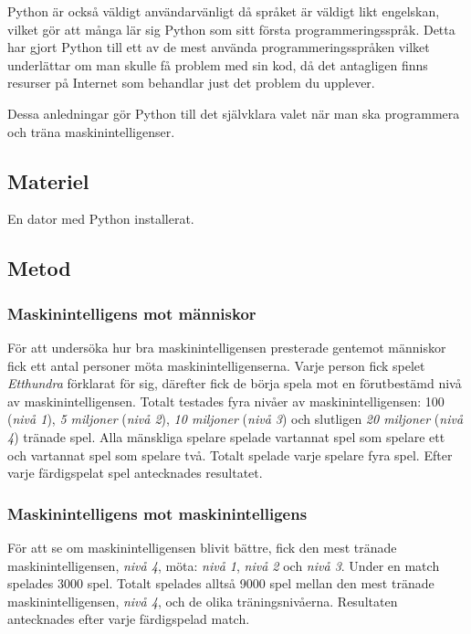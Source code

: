 \documentclass[12pt,a4paper]{article}
\begin{document}
      Python är också väldigt användarvänligt då språket är väldigt likt engelskan, vilket gör att många lär sig Python som sitt första programmeringsspråk. Detta har gjort Python till ett av de mest använda programmeringsspråken vilket underlättar om man skulle få problem med sin kod, då det antagligen finns resurser på Internet som behandlar just det problem du upplever. \cite{ref:stackoverflow}
      
      Dessa anledningar gör Python till det självklara valet när man ska programmera och träna maskinintelligenser.
    

    \subsection{Materiel}\label{subsec:materiel}
      En dator med Python installerat.
    

    \subsection{Metod}\label{subsec:metod}
      \subsubsection{Maskinintelligens mot människor}
      \label{subsubsec:maskinintelligensmotmanniskor}
        För att undersöka hur bra maskinintelligensen presterade gentemot människor fick ett antal personer möta maskinintelligenserna. Varje person fick spelet \emph{Etthundra} förklarat för sig, därefter fick de börja spela mot en förutbestämd nivå av maskinintelligensen. Totalt testades fyra nivåer av maskinintelligensen: 100 (\emph{nivå 1}), \emph{5 miljoner} (\emph{nivå 2}), \emph{10 miljoner} (\emph{nivå 3}) och slutligen \emph{20 miljoner} (\emph{nivå 4}) tränade spel. Alla mänskliga spelare spelade vartannat spel som spelare ett och vartannat spel som spelare två. Totalt spelade varje spelare fyra spel. Efter varje färdigspelat spel antecknades resultatet.
  

      \subsubsection{Maskinintelligens mot maskinintelligens}
      \label{subsubsec:maskinintelligensmotmaskinintelligens}
        För att se om maskinintelligensen blivit bättre, fick den mest tränade maskinintelligensen, \emph{nivå 4}, möta: \emph{nivå 1}, \emph{nivå 2} och \emph{nivå 3}. Under en match spelades 3000 spel. Totalt spelades alltså 9000 spel mellan den mest tränade maskinintelligensen, \emph{nivå 4}, och de olika träningsnivåerna. Resultaten antecknades efter varje färdigspelad match.
    
\end{document}
